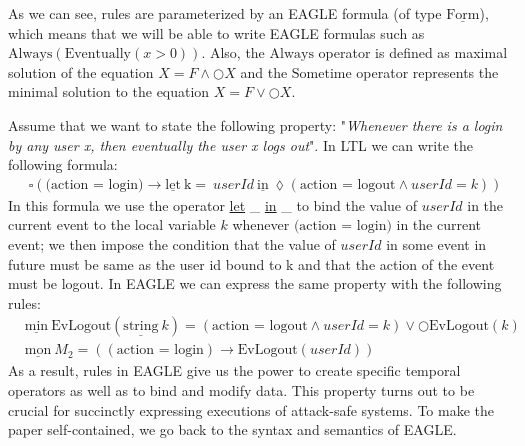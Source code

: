 \documentclass[english]{article}
\begin{document}
As we can see, rules are parameterized by an EAGLE formula (of type $\underline{\text{Form}}$), which means that we will be able to write EAGLE formulas such as $\text{Always}(\text{Eventually}(x>0))$. Also, the $\text{Always}$ operator is defined as maximal solution of the equation $X=F\land \bigcirc X$ and the $\text{Sometime}$ operator represents the minimal solution to the equation $X=F\lor \bigcirc X$.


Assume that we want to state the following property: "\textit{Whenever there is a login by any user x, then eventually the user x logs out}". In LTL we can write the following formula: 
\begin{align*}
    & \square{(\text{(action = login)}\rightarrow \underline{\text{let}}\ \text{k} =\ userId\ \underline{\text{in}}\ \lozenge(\text{action = logout}\land userId = k))}
\end{align*}
In this formula we use the operator \underline{let} \_ \underline{in} \_ to bind the value of $userId$ in the current event to the local variable $k$ whenever $\text{(action = login)}$ in the current event; we then impose the condition that the value of $userId$ in some event in future must be same as the user id bound to k and that the action of the event must be logout.
In EAGLE we can express the same property with the following rules:
\begin{align*}
    & \underline{\text{min}}\ \text{EvLogout}(\underline{\text{string}}\ k) = (\text{action = logout}\land userId = k) \lor \bigcirc \text{EvLogout}(k) \\
    & \underline{\text{mon}}\ M_2 = ((\text{action = login})\rightarrow \text{EvLogout}(userId)) 
\end{align*}
As a result, rules in EAGLE give us the power to create specific temporal operators as well as to bind and modify data. This property turns out to be crucial for succinctly expressing executions of attack-safe systems. To make the paper self-contained, we go back to the syntax and semantics of EAGLE.
\end{document}
